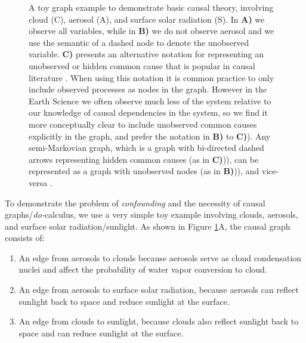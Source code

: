 \documentclass[12pt]{article}
\begin{document}
\begin{figure}
  \scalebox{1.0}{}
  \caption{A toy graph example to demonstrate basic causal theory,
    involving cloud (C), aerosol (A), and surface solar radiation
    (S). In \textbf{A)} we observe all variables, while in \textbf{B)}
    we do not observe aerosol and we use the semantic of a dashed node
    to denote the unobserved variable. \textbf{C)} presents an
    alternative notation for representing an unobserved or hidden
    common cause that is popular in causal literature \citep[e.g.,
    ``semi-Markovian graphs'',][]{shpitser2006}. When using this
    notation it is common practice to only include observed processes
    as nodes in the graph. However in the Earth Science we often
    observe much less of the system relative to our knowledge of
    causal dependencies in the system, so we find it more conceptually
    clear to include unobserved common causes explicitly in the graph,
    and prefer the notation in \textbf{B)} to \textbf{C)}). Any
    semi-Markovian graph, which is a graph with bi-directed dashed
    arrows representing hidden common causes (as in \textbf{C)})), can
    be represented as a graph with unobserved nodes (as in
    \textbf{B)})), and vice-versa \citep[e.g.,][]{lee2019structural}.}
  \label{fig:toy}
\end{figure}

To demonstrate the problem of \textit{confounding} and the necessity
of causal graphs/\textit{do-}calculus, we use a very simple toy
example involving clouds, aerosols, and surface solar
radiation/sunlight. As shown in Figure \ref{fig:toy}A, the causal
graph consists of:

\begin{enumerate}
\item An edge from aerosols to clouds because aerosols serve as cloud
  condensation nuclei and affect the probability of water vapor
  conversion to cloud.
\item An edge from aerosols to surface solar radiation, because
  aerosols can reflect sunlight back to space and reduce sunlight at
  the surface.
\item An edge from clouds to sunlight, because clouds also reflect
  sunlight back to space and can reduce sunlight at the surface.
\end{enumerate}
\end{document}
